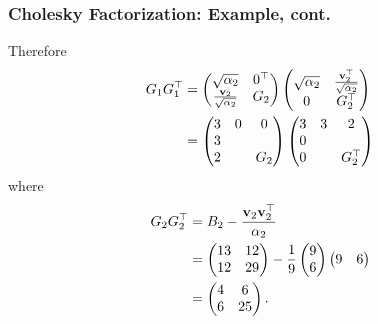 \documentclass{beamer}
\begin{document}
\begin{frame}\frametitle{Cholesky Factorization: Example, cont.}
	Therefore
	\begin{align*}
		G_1 G_1^\top &= \begin{pmatrix}
 				\sqrt{\alpha_2} & 0^\top \\ \frac{\mathbf{v}_2}{\sqrt{\alpha_2}} & G_2
 			 \end{pmatrix}
 			 \begin{pmatrix}
 				\sqrt{\alpha_2} & \frac{\mathbf{v}_2^\top}{\sqrt{\alpha_2}} \\ 0 & G_2^\top
 			 \end{pmatrix} \\
 		&= \begin{pmatrix}
				3 & 0 & 0  \\
				3 &  &  \\
				2 &   & G_2 
			\end{pmatrix}
			\begin{pmatrix}
				3 & 3 & 2 \\
				0 &  & \\
				0 &   &  G_2^\top 
			\end{pmatrix}
	\end{align*}
	where
	\begin{align*}
		G_2 G_2^\top &= B_2 - \frac{\mathbf{v}_2 \mathbf{v}_2^\top}{\alpha_2} \\
		&= \begin{pmatrix}
 				13 & 12 \\
 				12 & 29  
 			\end{pmatrix}
 			- \frac{1}{9} \begin{pmatrix} 9 \\ 6 \end{pmatrix}
 			  \begin{pmatrix} 9 & 6 \end{pmatrix} \\
 		&= 	\begin{pmatrix}
 				4 & 6 \\ 6 & 25
 			\end{pmatrix}.
	\end{align*}
\end{frame}
\end{document}
